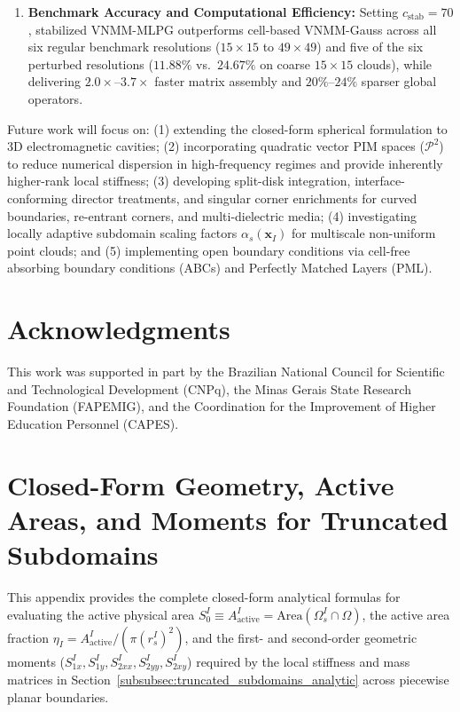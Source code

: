 \documentclass[preprint,12pt]{elsarticle}
\begin{document}
\begin{enumerate}
    \item \textbf{Benchmark Accuracy and Computational Efficiency:} Setting $c_{\mathrm{stab}} = 70$, stabilized VNMM-MLPG outperforms cell-based VNMM-Gauss across all six regular benchmark resolutions ($15\times 15$ to $49\times 49$) and five of the six perturbed resolutions ($11.88\%$ vs.\ $24.67\%$ on coarse $15\times 15$ clouds), while delivering $2.0\times\text{--}3.7\times$ faster matrix assembly and $20\%\text{--}24\%$ sparser global operators.
\end{enumerate}

Future work will focus on: (1) extending the closed-form spherical formulation to 3D electromagnetic cavities; (2) incorporating quadratic vector PIM spaces ($\mathcal{P}^2$) to reduce numerical dispersion in high-frequency regimes and provide inherently higher-rank local stiffness; (3) developing split-disk integration, interface-conforming director treatments, and singular corner enrichments for curved boundaries, re-entrant corners, and multi-dielectric media; (4) investigating locally adaptive subdomain scaling factors $\alpha_s(\mathbf{x}_I)$ for multiscale non-uniform point clouds; and (5) implementing open boundary conditions via cell-free absorbing boundary conditions (ABCs) and Perfectly Matched Layers (PML).

\section*{Acknowledgments}
This work was supported in part by the Brazilian National Council for Scientific and Technological Development (CNPq), the Minas Gerais State Research Foundation (FAPEMIG), and the Coordination for the Improvement of Higher Education Personnel (CAPES).

\appendix
\section{Closed-Form Geometry, Active Areas, and Moments for Truncated Subdomains}
\label{app:truncated_geometry}

This appendix provides the complete closed-form analytical formulas for evaluating the active physical area $S_0^I \equiv A_{\mathrm{active}}^I = \mathrm{Area}(\Omega_s^I \cap \Omega)$, the active area fraction $\eta_I = A_{\mathrm{active}}^I / (\pi (r_s^I)^2)$, and the first- and second-order geometric moments ($S_{1x}^I, S_{1y}^I, S_{2xx}^I, S_{2yy}^I, S_{2xy}^I$) required by the local stiffness and mass matrices in Section~\ref{subsubsec:truncated_subdomains_analytic} across piecewise planar boundaries.
\end{document}
